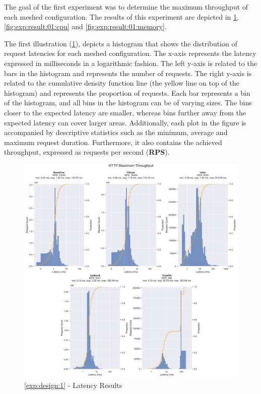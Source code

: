 The goal of the first experiment was to determine the maximum throughput of each meshed configuration. The results of this experiment are depicted in \cref{fig:exp:result:01:latency}, \cref{fig:exp:result:01:cpu} and \cref{fig:exp:result:01:memory}. 

The first illustration (\cref{fig:exp:result:01:latency}), depicts a histogram that shows the distribution of request latencies for each meshed configuration. The x-axis represents the latency expressed in milliseconds in a logarithmic fashion. The left y-axis is related to the bars in the histogram and represents the number of requests. The right y-axis is related to the cumulative density function line (the yellow line on top of the histogram) and represents the proportion of requests. Each bar represents a bin of the histogram, and all bins in the histogram can be of varying sizes. The bins closer to the expected latency are smaller, whereas bins further away from the expected latency can cover larger areas. Additionally, each plot in the figure is accompanied by descriptive statistics such as the minimum, average and maximum request duration. Furthermore, it also contains the achieved throughput, expressed as requests per second (\textbf{RPS}).


\begin{figure}[!t]
    \centering
    
    \includegraphics[width=\linewidth]{5_experimental_evaluation/figures/exp_01-latency-results.pdf}

    \caption{\ref{exp:design:1} - Latency Results}
    
    \label{fig:exp:result:01:latency}
\end{figure}



